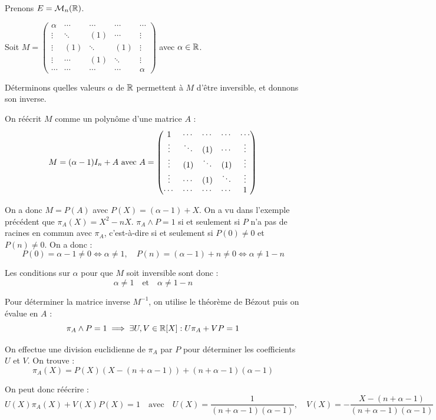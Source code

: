 \documentclass[11pt,a4paper]{report}
\begin{document}
\begin{example}
    Prenons $E= \mathcal M_n(\mathbb{R})$.

    Soit $M = \left(\begin{matrix} \alpha & \cdots & \cdots & \cdots & \cdots \\ \vdots & \ddots & (1) & \cdots & \vdots \\ \vdots & (1) & \ddots & (1) & \vdots \\ \vdots & \cdots & (1) & \ddots & \vdots \\ \cdots & \cdots & \cdots & \cdots & \alpha\end{matrix}\right)$ avec $\alpha \in \mathbb{R}$.

    Déterminons quelles valeurs $\alpha$ de $\mathbb{R}$ permettent à $M$ d'être inversible, et donnons son inverse.

    On réécrit $M$ comme un polynôme d'une matrice $A$ :
    $$M = (\alpha - 1)I_n + A \text{ avec } A = \left(\begin{matrix} 1 & \cdots & \cdots & \cdots & \cdots \\ \vdots & \ddots & (1) & \cdots & \vdots \\ \vdots & (1) & \ddots & (1) & \vdots \\ \vdots & \cdots & (1) & \ddots & \vdots \\ \cdots & \cdots & \cdots & \cdots & 1\end{matrix}\right)$$

    On a donc $M = P(A)$ avec $P(X) = (\alpha - 1) + X$. On a vu dans l'exemple précédent que $\pi_A(X) = X^2 - nX$. $\pi_A \wedge P = 1$ si et seulement si $P$ n'a pas de racines en commun avec $\pi_A$, c'est-à-dire si et seulement si $P(0) \ne 0$ et $P(n) \ne 0$. On a donc :
    \[
        P(0) = \alpha - 1 \ne 0 \iff \alpha \ne 1, \quad P(n) = (\alpha - 1) + n \ne 0 \iff \alpha \ne 1 - n
    \]

    Les conditions sur $\alpha$ pour que $M$ soit inversible sont donc :
    \[
        \alpha \ne 1 \quad \text{et} \quad \alpha \ne 1 - n
    \]

    Pour déterminer la matrice inverse $M^{-1}$, on utilise le théorème de Bézout puis on évalue en $A$ :
    \[
        \pi_A \wedge P = 1 \implies \exists U, V \in \mathbb{R}[X] : U\pi_A + VP = 1
    \]

    On effectue une division euclidienne de $\pi_A$ par $P$ pour déterminer les coefficients $U$ et $V$. On trouve :
    \[
        \pi_A(X) = P(X)(X - (n+\alpha -1)) + (n+\alpha -1)(\alpha - 1)
    \]

    On peut donc réécrire :
    $$
        U(X)\pi_A(X) + V(X)P(X) = 1 \quad \text{avec} \quad U(X) = \frac{1}{(n+\alpha -1)(\alpha - 1)}, \quad V(X) = -\frac{X - (n+\alpha -1)}{(n+\alpha -1)(\alpha - 1)}
    $$


\end{example}
\end{document}
